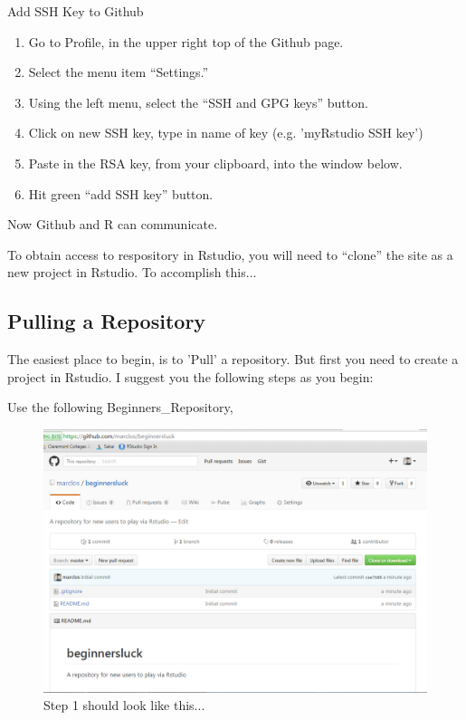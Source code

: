 \documentclass[12pt]{../SOP3_beta}
\begin{document}
\NP Add SSH Key to Github
  \begin{enumerate}
  \item Go to Profile, in the upper right top of the Github page.
  \item Select the menu item ``Settings.''
  \item Using the left menu, select the ``SSH and GPG keys'' button.
  \item Click on new SSH key, type in name of key (e.g. 'myRstudio SSH key')
  \item Paste in the RSA key, from your clipboard, into the window below.
  \item Hit green ``add SSH key'' button.
  \end{enumerate}
  
\NP Now Github and R can communicate. 

\NP To obtain access to respository in Rstudio, you will need to ``clone'' the site as a new project in Rstudio. To accomplish this...

\subsection{Pulling a Repository}

\NP The easiest place to begin, is to 'Pull' a repository. But first you need to create a project in Rstudio. I suggest you the following steps as you begin:

Use the following Beginners_Repository,


\begin{figure}
\includegraphics{graphics/CloningGithub.jpg}
\caption{Step 1 should look like this...}
\end{figure}
\end{document}
